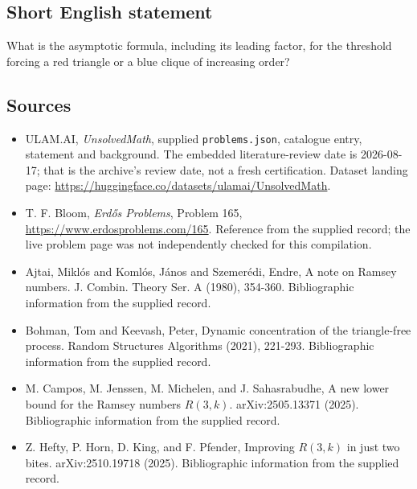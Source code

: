 \documentclass[11pt,a4paper]{article}
\begin{document}
\subsection{Short English statement}

What is the asymptotic formula, including its leading factor, for the threshold forcing a red triangle or a blue clique of increasing order?

\subsection{Sources}

{\small

\begin{itemize}

\item[\hypertarget{source:statement:1}{S1}] ULAM.AI, \emph{UnsolvedMath}, supplied \texttt{problems.json}, catalogue entry, statement and background. The embedded literature-review date is 2026-08-17; that is the archive’s review date, not a fresh certification. Dataset landing page: \url{https://huggingface.co/datasets/ulamai/UnsolvedMath}.

\item[\hypertarget{source:statement:2}{S2}] T. F. Bloom, \emph{Erdős Problems}, Problem 165, \url{https://www.erdosproblems.com/165}. Reference from the supplied record; the live problem page was not independently checked for this compilation.

\item[\hypertarget{source:statement:3}{S3}] Ajtai, Mikl\'{o}s and Koml\'{o}s, J\'{a}nos and Szemer\'{e}di, Endre, A note on Ramsey numbers. J. Combin. Theory Ser. A (1980), 354-360. Bibliographic information from the supplied record.

\item[\hypertarget{source:statement:4}{S4}] Bohman, Tom and Keevash, Peter, Dynamic concentration of the triangle-free process. Random Structures Algorithms (2021), 221-293. Bibliographic information from the supplied record.

\item[\hypertarget{source:statement:5}{S5}] M. Campos, M. Jenssen, M. Michelen, and J. Sahasrabudhe, A new lower bound for the Ramsey numbers $R(3,k)$. arXiv:2505.13371 (2025). Bibliographic information from the supplied record.

\item[\hypertarget{source:statement:6}{S6}] Z. Hefty, P. Horn, D. King, and F. Pfender, Improving $R(3,k)$ in just two bites. arXiv:2510.19718 (2025). Bibliographic information from the supplied record.

\end{itemize}

}

\label{end:statement}
\end{document}
